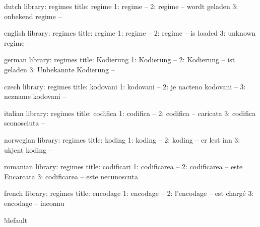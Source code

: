 
\unprotect


\startmessages  dutch  library: regimes
  title: regime
      1: regime --
      2: regime -- wordt geladen
      3: onbekend regime --
\stopmessages

\startmessages  english  library: regimes
  title: regime
      1: regime --
      2: regime -- is loaded
      3: unknown regime --
\stopmessages

\startmessages  german  library: regimes
  title: Kodierung
      1: Kodierung --
      2: Kodierung -- ist geladen
      3: Unbekannte Kodierung --
\stopmessages

\startmessages  czech  library: regimes
  title: kodovani
      1: kodovani --
      2: je nacteno kodovani --
      3: nezname kodovani --
\stopmessages

\startmessages  italian  library: regimes
  title: codifica
      1: codifica --
      2: codifica -- caricata
      3: codifica sconosciuta --
\stopmessages

\startmessages  norwegian  library: regimes
  title: koding
      1: koding --
      2: koding -- er lest inn
      3: ukjent koding --
\stopmessages

\startmessages  romanian  library: regimes
  title: codificari
      1: codificarea --
      2: codificarea -- este Encarcata
      3: codificarea -- este necunoscuta
\stopmessages

\startmessages  french  library: regimes
  title: encodage
      1: encodage --
      2: l'encodage -- est chargé
      3: encodage -- inconnu
\stopmessages


\def\@reg@{@r@eg@} %


\let\currentregime\empty
\let\defaultregime\s!default


\let\mkloadregime   \gobbleoneargument
\let\mkenableregime \gobbleoneargument
\let\mkdisableregime\relax
\let\mkshowregime   \gobbleoneargument
\let\mkwalkregime   \gobbleoneargument
\let\mkautosetregime\gobbletwoarguments

